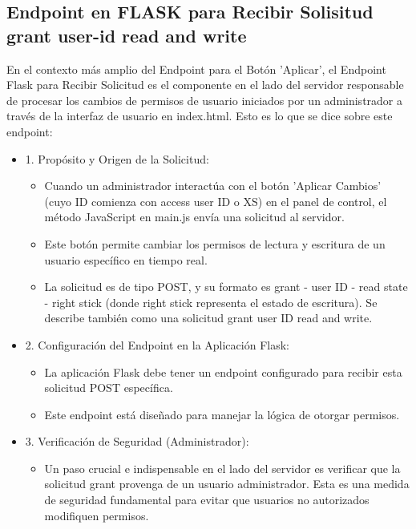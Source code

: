\documentclass{report}
\begin{document}
\subsection{Endpoint en FLASK para Recibir Solisitud \textbf{grant user-id read and write}}
En el contexto más amplio del Endpoint para el Botón 'Aplicar', el Endpoint Flask para Recibir Solicitud es el componente en el lado 
del servidor responsable de procesar los cambios de permisos de usuario iniciados por un administrador a través de la interfaz de 
usuario en index.html.
Esto es lo que se dice sobre este endpoint:
\begin{itemize}
    \item 1. Propósito y Origen de la Solicitud:
        \begin{itemize}
            \item Cuando un administrador interactúa con el botón 'Aplicar Cambios' (cuyo ID comienza con access user ID o XS) en el panel 
            de control, el método JavaScript en main.js envía una solicitud al servidor.
            \item Este botón permite cambiar los permisos de lectura y escritura de un usuario específico en tiempo real.
            \item La solicitud es de tipo POST, y su formato es grant - user ID - read state - right stick (donde right stick representa el 
            estado de escritura). Se describe también como una solicitud grant user ID read and write.
        \end{itemize}
    \item 2. Configuración del Endpoint en la Aplicación Flask:
        \begin{itemize}
            \item La aplicación Flask debe tener un endpoint configurado para recibir esta solicitud POST específica.
            \item Este endpoint está diseñado para manejar la lógica de otorgar permisos.
        \end{itemize}
    \item 3. Verificación de Seguridad (Administrador):
        \begin{itemize}
            \item Un paso crucial e indispensable en el lado del servidor es verificar que la solicitud grant provenga de un usuario 
            administrador. Esta es una medida de seguridad fundamental para evitar que usuarios no autorizados modifiquen permisos.

\end{itemize}
\end{itemize}
\end{document}
